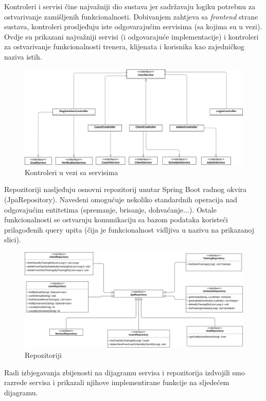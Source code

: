 	\noindent Kontroleri i servisi čine najvažniji dio sustava jer sadržavaju logiku potrebnu za ostvarivanje zamišljenih funkcionalnosti. Dobivanjem zahtjeva sa \textit{frontend} strane sustava, kontroleri prosljeđuju iste odgovarajućim servisima (sa kojima su u vezi). Ovdje su prikazani najvažniji servisi (i odgovarajuće implementacije) i kontroleri za ostvarivanje funkcionalnosti trenera, klijenata i korisnika kao zajedničkog naziva istih.
	\begin{figure}[H]
		\includegraphics[scale=0.4]{./Dijagrami/controllers_services.png}
		\centering
		\caption{Kontroleri u vezi sa servisima}
		\label{fig:promjene}
	\end{figure}
	\noindent Repozitoriji nasljeđuju osnovni repozitorij unutar Spring Boot radnog okvira (JpaRepository). Navedeni omogućuje nekoliko standardnih operacija nad odgovajućim entitetima (spremanje, brisanje, dohvaćanje...). Ostale funkcionalnosti se ostvaruju komunikaciju sa bazom podataka koristeći prilagođenih query upita (čija je funkcionalnost vidljiva u nazivu na prikazanoj slici).
	\begin{figure}[H]
		\includegraphics[scale=0.35]{./Dijagrami/repository.png}
		\centering
		\caption{Repozitoriji}
		\label{fig:promjene}
	\end{figure}
        \noindent Radi izbjegavanja zbijenosti na dijagramu servisa i repozitorija izdvojili smo razrede servisa i prikazali njihove implementirane funkcije na sljedećem dijagramu.
